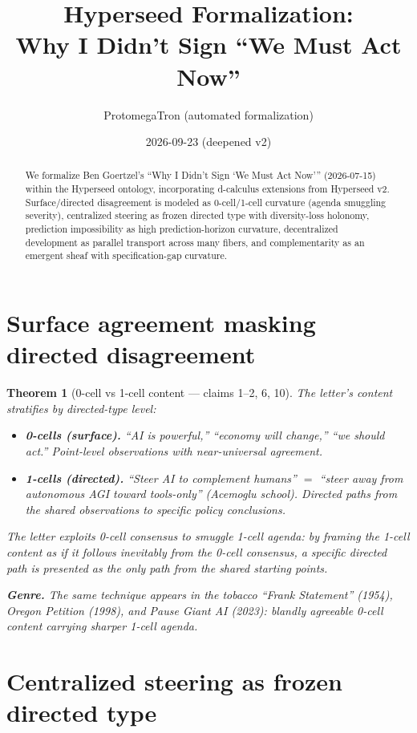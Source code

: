 \documentclass[11pt,a4paper]{article}
\title{Hyperseed Formalization:\\
  Why I Didn't Sign ``We Must Act Now''}
\author{ProtomegaTron (automated formalization)}
\date{2026-09-23 (deepened v2)}
\newtheorem{theorem}[definition]{Theorem}
\begin{document}
\maketitle

\begin{abstract}
We formalize Ben Goertzel's ``Why I Didn't Sign `We Must Act Now'''
(2026-07-15) within the Hyperseed ontology, incorporating d-calculus
extensions from Hyperseed v2. Surface/directed disagreement is modeled
as 0-cell/1-cell curvature (agenda smuggling severity), centralized
steering as frozen directed type with diversity-loss holonomy,
prediction impossibility as high prediction-horizon curvature,
decentralized development as parallel transport across many fibers,
and complementarity as an emergent sheaf with specification-gap
curvature.
\end{abstract}

\tableofcontents

\section{Surface agreement masking directed disagreement}

\begin{theorem}[0-cell vs 1-cell content --- claims 1--2, 6, 10]
\label{thm:surface}
The letter's content stratifies by directed-type level:
\begin{itemize}
  \item \textbf{0-cells (surface).} ``AI is powerful,'' ``economy will
    change,'' ``we should act.'' Point-level observations with near-universal
    agreement.
  \item \textbf{1-cells (directed).} ``Steer AI to complement humans''
    $=$ ``steer away from autonomous AGI toward tools-only'' (Acemoglu
    school). Directed paths from the shared observations to specific
    policy conclusions.
\end{itemize}
The letter exploits 0-cell consensus to smuggle 1-cell agenda: by
framing the 1-cell content as if it follows inevitably from the 0-cell
consensus, a specific directed path is presented as the only path from
the shared starting points.

\textbf{Genre.} The same technique appears in the tobacco ``Frank
Statement'' (1954), Oregon Petition (1998), and Pause Giant AI (2023):
blandly agreeable 0-cell content carrying sharper 1-cell agenda.
\end{theorem}

\section{Centralized steering as frozen directed type}
\end{document}
